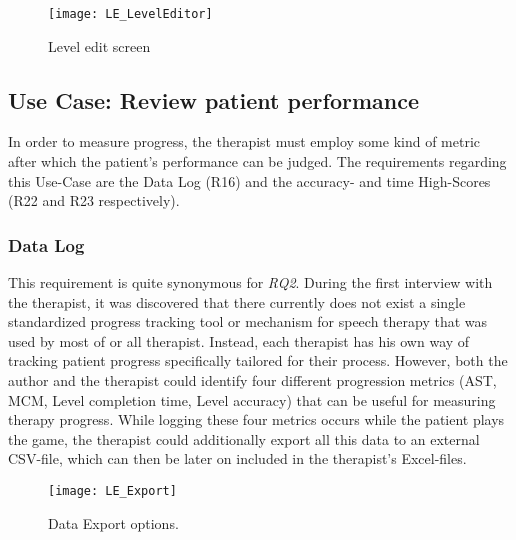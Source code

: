 \documentclass[draft,final]{vutinfth} %
\begin{document}
\begin{figure}
  \centering
  \texttt{[image: LE\_LevelEditor]}
  \caption{Level edit screen}
\end{figure}


\subsection{Use Case: Review patient performance}
In order to measure progress, the therapist must employ some kind of metric after which the patient's performance can be judged. The requirements regarding this Use-Case are the Data Log (R16) and the accuracy- and time High-Scores (R22 and R23 respectively).
\subsubsection{Data Log}
This requirement is quite synonymous for \emph{RQ2}. During the first interview with the therapist, it was discovered that there currently does not exist a single standardized progress tracking tool or mechanism for speech therapy that was used by most of or all therapist. Instead, each therapist has his own way of tracking patient progress specifically tailored for their process. However, both the author and the therapist could identify four different progression metrics (AST, MCM, Level  completion time, Level accuracy) that can be useful for measuring therapy progress. While logging these four metrics occurs while the patient plays the game, the therapist could additionally export all this data to an external CSV-file, which can then be later on included in the therapist's Excel-files.

\begin{figure}
  \centering
  \texttt{[image: LE\_Export]}
  \caption{Data Export options.}
\end{figure}
\end{document}
